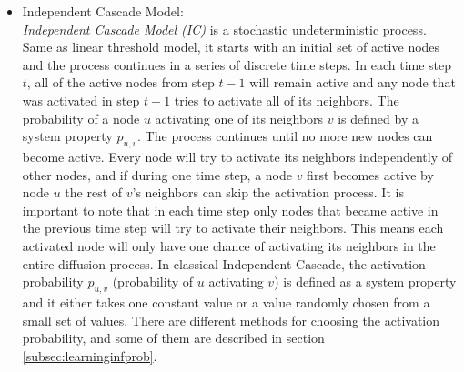\documentclass[english]{tktltiki}
\begin{document}
\begin{itemize}
\item Independent Cascade Model:\\ 
\textit{Independent Cascade Model (IC)} is a stochastic undeterministic process. 
Same as linear threshold model, it starts with an initial set of active nodes and the process continues in a series of discrete time steps. 
In each time step $t$, all of the active nodes from step $t-1$ will remain active and any node that was activated in step $t-1$ tries to activate all of its neighbors. 
The probability of a node $u$ activating one of its neighbors $v$ is defined by a system property $p_{u,v}$. 
The process continues until no more new nodes can become active. 
Every node will try to activate its neighbors independently of other nodes, and if during one time step, a node $v$ first becomes active by node $u$ the rest of $v$'s neighbors can skip the activation process. 
It is important to note that in each time step only nodes that became active in the previous time step will try to activate their neighbors.
This means each activated node will only have one chance of activating its neighbors in the entire diffusion process. 
In classical Independent Cascade, the activation probability $p_{u,v}$ (probability of $u$ activating $v$) is defined as a system property and it either takes one constant value or a value randomly chosen from a small set of values. 
There are different methods for choosing the activation probability, and some of them are described in section \ref{subsec:learninginfprob}. 
\end{itemize}
\end{document}
